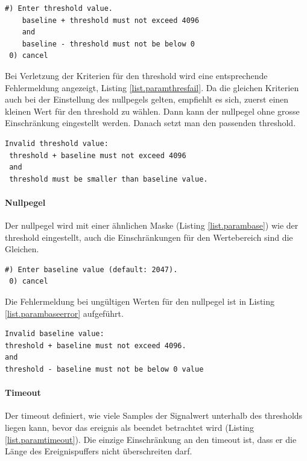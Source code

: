 \begin{lstlisting}[caption=Untermenü Threshold, label=list.paramthres]
 #) Enter threshold value.
    baseline + threshold must not exceed 4096
    and
    baseline - threshold must not be below 0
 0) cancel
\end{lstlisting}

Bei Verletzung der Kriterien für den \gls{threshold} wird eine entsprechende Fehlermeldung angezeigt, Listing \ref{list.paramthresfail}. Da die gleichen Kriterien auch bei der Einstellung des \gls{nullpegel}s gelten, empfiehlt es sich, zuerst einen kleinen Wert für den \gls{threshold} zu wählen. Dann kann der \gls{nullpegel} ohne grosse Einschränkung eingestellt werden. Danach setzt man den passenden \gls{threshold}.

\begin{lstlisting}[caption=Fehlermeldung ungültiger Threshold, label=list.paramthresfail]
 Invalid threshold value:
 threshold + baseline must not exceed 4096
 and
 threshold must be smaller than baseline value.
\end{lstlisting}

\paragraph{Nullpegel} Der \gls{nullpegel} wird mit einer ähnlichen Maske (Listing \ref{list.parambase}) wie der \gls{threshold} eingestellt, auch die Einschränkungen für den Wertebereich sind die Gleichen.

\begin{lstlisting}[caption=Untermenü Null-Level, label=list.parambase]
 #) Enter baseline value (default: 2047).
 0) cancel
\end{lstlisting}

Die Fehlermeldung bei ungültigen Werten für den \gls{nullpegel} ist in Listing \ref{list.parambaseerror} aufgeführt.

\begin{lstlisting}[caption=Fehlermeldung ungültiger Nullpegel, label=list.parambaseerror]
Invalid baseline value:
threshold + baseline must not exceed 4096.
and
threshold - baseline must not be below 0 value
\end{lstlisting}

\paragraph{Timeout} Der \gls{timeout} definiert, wie viele Samples der Signalwert unterhalb des \gls{threshold}s liegen kann, bevor das \gls{ereignis} als beendet betrachtet wird (Listing \ref{list.paramtimeout}). Die einzige Einschränkung an den \gls{timeout} ist, dass er die Länge des Ereignispuffers nicht überschreiten darf.

